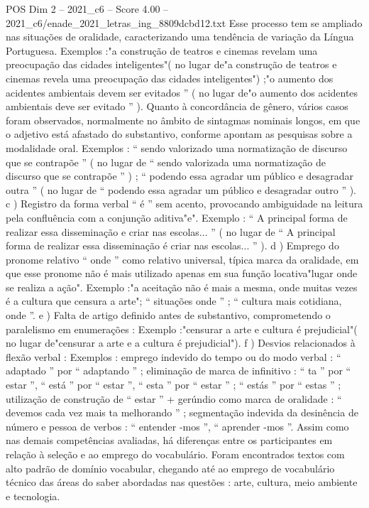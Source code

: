 \begin{textsample}{POS Dim 2 – 2021\_c6 – Score 4.00 – 2021\_c6/enade\_2021\_letras\_ing\_8809dcbd12.txt}
Esse processo tem se ampliado nas situações de oralidade, caracterizando uma tendência de variação da Língua Portuguesa.
Exemplos :"a construção de teatros e cinemas revelam uma preocupação das cidades inteligentes"( no lugar de"a construção de teatros e cinemas revela uma preocupação das cidades inteligentes") ;"o aumento dos acidentes ambientais devem ser evitados ” ( no lugar de"o aumento dos acidentes ambientais deve ser evitado ” ).
Quanto à concordância de gênero, vários casos foram observados, normalmente no âmbito de sintagmas nominais longos, em que o adjetivo está afastado do substantivo, conforme apontam as pesquisas sobre a modalidade oral.
Exemplos : “ sendo valorizado uma normatização de discurso que se contrapõe ” ( no lugar de “ sendo valorizada uma normatização de discurso que se contrapõe ” ) ; “ podendo essa agradar um público e desagradar outra ” ( no lugar de “ podendo essa agradar um público e desagradar outro ” ). c ) Registro da forma verbal “ é ” sem acento, provocando ambiguidade na leitura pela confluência com a conjunção aditiva"e".
Exemplo : “ A principal forma de realizar essa disseminação e criar nas escolas... ” ( no lugar de “ A principal forma de realizar essa disseminação é criar nas escolas... ” ). d ) Emprego do pronome relativo “ onde ” como relativo universal, típica marca da oralidade, em que esse pronome não é mais utilizado apenas em sua função locativa"lugar onde se realiza a ação".
Exemplo :"a aceitação não é mais a mesma, onde muitas vezes é a cultura que censura a arte"; “ situações onde ” ; “ cultura mais cotidiana, onde ”. e ) Falta de artigo definido antes de substantivo, comprometendo o paralelismo em enumerações : Exemplo :"censurar a arte e cultura é prejudicial"( no lugar de"censurar a arte e a cultura é prejudicial"). f ) Desvios relacionados à flexão verbal : Exemplos : emprego indevido do tempo ou do modo verbal : “ adaptado ” por “ adaptando ” ; eliminação de marca de infinitivo : “ ta ” por “ estar ”, “ está ” por “ estar ”, “ esta ” por “ estar ” ; “ estás ” por “ estas ” ; utilização de construção de “ estar ” + gerúndio como marca de oralidade : “ devemos cada vez mais ta melhorando ” ; segmentação indevida da desinência de número e pessoa de verbos : “ entender -mos ”, “ aprender -mos ”.
Assim como nas demais competências avaliadas, há diferenças entre os participantes em relação à seleção e ao emprego do vocabulário.
Foram encontrados textos com alto padrão de domínio vocabular, chegando até ao emprego de vocabulário técnico das áreas do saber abordadas nas questões : arte, cultura, meio ambiente e tecnologia.

\end{textsample}
